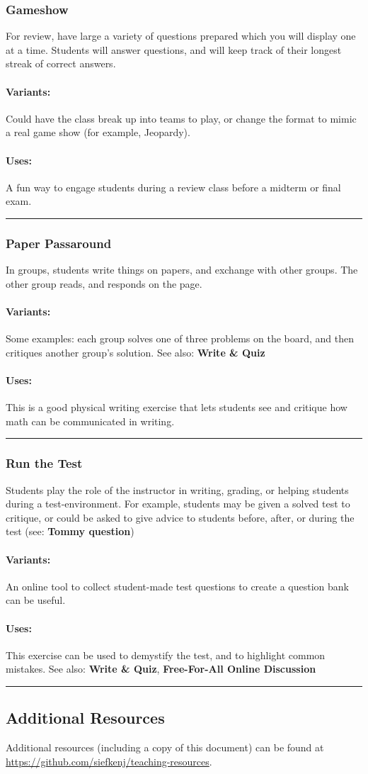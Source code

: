 \documentclass{book}
\newcommand{\addtoolboxitem}[4]{\subsubsection*{#1}\vspace{-.1cm} #2 \vspace{-.5cm}\paragraph{Variants:} #3 \vspace{-.5cm}\paragraph{Uses:} #4\par\noindent\rule{\linewidth}{0.4pt}}
\begin{document}
\begin{multicols}{2}
\addtoolboxitem{Gameshow}{For review, have large a variety of questions prepared which you will display one at a time. Students will answer questions, and will keep track of their longest streak of correct answers.}{Could have the class break up into teams to play, or change the format to mimic a real game show (for example, Jeopardy).}{A fun way to engage students during a review class before a midterm or final exam.}

\addtoolboxitem{Paper Passaround}{In groups, students write things on papers, and exchange with other groups. The other group reads, and responds on the page.}{Some examples: each group solves one of three problems on the board, and then critiques another group's solution. See also: \textbf{Write \& Quiz}}{This is a good physical writing exercise that 
lets students see and critique how math can be communicated in writing.}

\addtoolboxitem{Run the Test}{Students play the role of the instructor in writing, grading, or helping students during a test-environment. For example, students may be given a solved test to critique, or could be asked to give advice to students before, after, or during the test (see: \textbf{Tommy question})}{An online tool to collect student-made test questions to create a question bank can be useful.}{This exercise can be used to demystify the test, and to highlight common mistakes. See also: \textbf{Write \& Quiz}, \textbf{Free-For-All Online Discussion}}

\end{multicols}

\subsection*{Additional Resources}
Additional resources (including a copy of this document) can be found at \url{https://github.com/siefkenj/teaching-resources}.

\begin{center}
\end{center}
		
\end{document}
